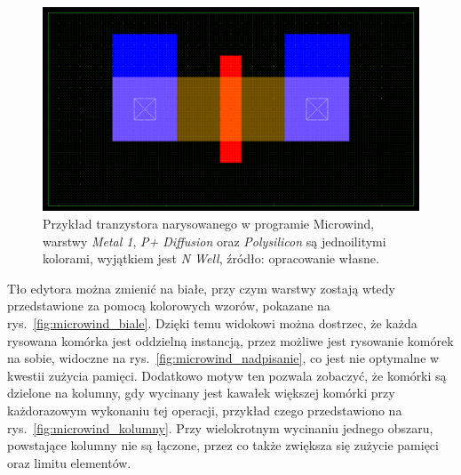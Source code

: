 \begin{figure}[h]
    \centering
    \includegraphics[width=.9\textwidth]{chapters/chapter2/img/microwind_tran}
    \caption[Przykład tranzystora narysowanego w programie Microwind.]
    {
        Przykład tranzystora narysowanego w programie Microwind,
        warstwy \textit{Metal 1}, \textit{P+ Diffusion} oraz \textit{Polysilicon} są jednoilitymi kolorami,
        wyjątkiem jest \textit{N Well},
        źródło: opracowanie własne.
    }
    \label{fig:microwind_tran}
\end{figure}

Tło edytora można zmienić na białe, przy czym warstwy zostają wtedy przedstawione za pomocą kolorowych wzorów,
pokazane na rys.~\ref{fig:microwind_biale}.
Dzięki temu widokowi można dostrzec, że każda rysowana komórka jest oddzielną instancją,
przez możliwe jest rysowanie komórek na sobie,
widoczne na rys.~\ref{fig:microwind_nadpisanie}, co jest nie optymalne w kwestii zużycia pamięci.
Dodatkowo motyw ten pozwala zobaczyć, że komórki są dzielone na kolumny,
gdy wycinany jest kawałek większej komórki przy każdorazowym wykonaniu tej operacji,
przykład czego przedstawiono na rys.~\ref{fig:microwind_kolumny}.
Przy wielokrotnym wycinaniu jednego obszaru,
powstające kolumny nie są łączone,
przez co także zwiększa się zużycie pamięci oraz limitu elementów.

